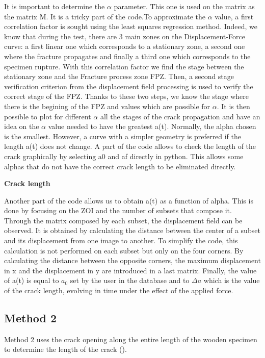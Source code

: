 It is important to determine the $\alpha$ parameter. This one is used on the matrix as the matrix M. It is a tricky part of the code.To approximate the $\alpha$ value, a first correlation factor is sought using the least squares regression method. Indeed, we know that during the test, there are 3 main zones on the Displacement-Force curve: a first linear one which corresponds to a stationary zone, a second one where the fracture propagates and finally a third one which corresponds to the specimen rupture. With this correlation factor we find the stage between the stationary zone and the Fracture process zone FPZ. Then, a second stage verification criterion from the displacement field processing is used to verify the correct stage of the FPZ.
Thanks to these two steps, we know the stage where there is the begining of the FPZ and values which are possible for $\alpha$.
It is then possible to plot for different $\alpha$ all the stages of the crack propagation and have an idea on the $\alpha$ value needed to have the greatest a(t). Normally, the alpha chosen is the smallest. However, a curve with a simpler geometry is preferred if the length a(t) does not change.
A part of the code allows to check the length of the crack graphically by selecting a0 and af directly in python. This allows some alphas that do not have the correct crack length to be eliminated directly.

\textbf{Crack length}

Another part of the code allows us to obtain a(t) as a function of alpha. This is done by focusing on the ZOI and the number of subsets that compose it. Through the matrix composed by each subset, the displacement field can be observed. It is obtained by calculating the distance between the center of a subset and its displacement from one image to another. To simplify the code, this calculation is not performed on each subset but only on the four corners. By calculating the distance between the opposite corners, the maximum displacement in x and the displacement in y are introduced in a last matrix. Finally, the value of a(t) is equal to $a_0$ set by the user in the database and to $\Delta a$ which is the value of the crack length, evolving in time under the effect of the applied force.

\subsection{Method 2}

Method 2 uses the crack opening along the entire length of the wooden specimen to determine the length of the crack (\cite{FilhoJ2022}). 

